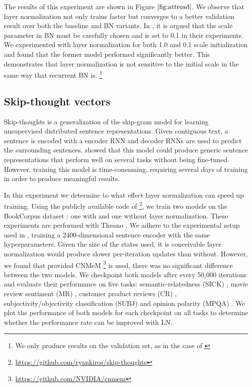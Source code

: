 The results of this experiment are shown in Figure $\ref{fig:attread}$. We observe that layer normalization not only trains faster but converges to a better validation result over both the baseline and BN variants. In \citet{cooijmans2016recurrent}, it is argued that the scale parameter in BN must be carefully chosen and is set to 0.1 in their experiments. We experimented with layer normalization for both 1.0 and 0.1 scale initialization and found that the former model performed significantly better. This demonstrates that layer normalization is not sensitive to the initial scale in the same way that recurrent BN is. \footnote{We only produce results on the validation set, as in the case of \citet{cooijmans2016recurrent}}

\subsection{Skip-thought vectors}

Skip-thoughts \citep{kiros2015skip} is a generalization of the skip-gram model \citep{mikolov2013efficient} for learning unsupervised distributed sentence representations. Given contiguous text, a sentence is encoded with a encoder RNN and decoder RNNs are used to predict the surrounding sentences. \citet{kiros2015skip} showed that this model could produce generic sentence representations that perform well on several tasks without being fine-tuned. However, training this model is time-consuming, requiring several days of training in order to produce meaningful results.

In this experiment we determine to what effect layer normalization can speed up training. Using the publicly available code of \citet{kiros2015skip} \footnote{\url{https://github.com/ryankiros/skip-thoughts}}, we train two models on the BookCorpus dataset \citep{zhu2015aligning}: one with and one without layer normalization. These experiments are performed with Theano \citep{team2016theano}. We adhere to the experimental setup used in \citet{kiros2015skip}, training a 2400-dimensional sentence encoder with the same hyperparameters. Given the size of the states used, it is conceivable layer normalization would produce slower per-iteration updates than without. However, we found that provided CNMeM \footnote{\url{https://github.com/NVIDIA/cnmem}} is used, there was no significant difference between the two models. We checkpoint both models after every 50,000 iterations and evaluate their performance on five tasks: semantic-relatedness (SICK) \citep{marelli2014semeval}, movie review sentiment (MR) \citep{pang2005seeing}, customer product reviews (CR) \citep{hu2004mining}, subjectivity/objectivity classification (SUBJ) \citep{pang2004sentimental} and opinion polarity (MPQA) \citep{wiebe2005annotating}. We plot the performance of both models for each checkpoint on all tasks to determine whether the performance rate can be improved with LN.

